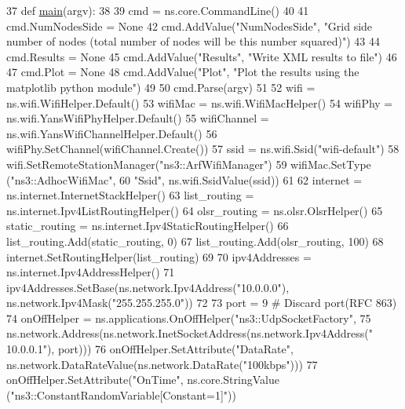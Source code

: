 \begin{DoxyCode}
37 \textcolor{keyword}{def }\hyperlink{namespacewifi-olsr-flowmon_ab8793f3e28ca4a531001056ef52436e4}{main}(argv):
38 
39     cmd = ns.core.CommandLine()
40 
41     cmd.NumNodesSide = \textcolor{keywordtype}{None}
42     cmd.AddValue(\textcolor{stringliteral}{"NumNodesSide"}, \textcolor{stringliteral}{"Grid side number of nodes (total number of nodes will be this number
       squared)"})
43 
44     cmd.Results = \textcolor{keywordtype}{None}
45     cmd.AddValue(\textcolor{stringliteral}{"Results"}, \textcolor{stringliteral}{"Write XML results to file"})
46 
47     cmd.Plot = \textcolor{keywordtype}{None}
48     cmd.AddValue(\textcolor{stringliteral}{"Plot"}, \textcolor{stringliteral}{"Plot the results using the matplotlib python module"})
49 
50     cmd.Parse(argv)
51 
52     wifi = ns.wifi.WifiHelper.Default()
53     wifiMac = ns.wifi.WifiMacHelper()
54     wifiPhy = ns.wifi.YansWifiPhyHelper.Default()
55     wifiChannel = ns.wifi.YansWifiChannelHelper.Default()
56     wifiPhy.SetChannel(wifiChannel.Create())
57     ssid = ns.wifi.Ssid(\textcolor{stringliteral}{"wifi-default"})
58     wifi.SetRemoteStationManager(\textcolor{stringliteral}{"ns3::ArfWifiManager"})
59     wifiMac.SetType (\textcolor{stringliteral}{"ns3::AdhocWifiMac"},
60                      \textcolor{stringliteral}{"Ssid"}, ns.wifi.SsidValue(ssid))
61 
62     internet = ns.internet.InternetStackHelper()
63     list\_routing = ns.internet.Ipv4ListRoutingHelper()
64     olsr\_routing = ns.olsr.OlsrHelper()
65     static\_routing = ns.internet.Ipv4StaticRoutingHelper()
66     list\_routing.Add(static\_routing, 0)
67     list\_routing.Add(olsr\_routing, 100)
68     internet.SetRoutingHelper(list\_routing)
69 
70     ipv4Addresses = ns.internet.Ipv4AddressHelper()
71     ipv4Addresses.SetBase(ns.network.Ipv4Address(\textcolor{stringliteral}{"10.0.0.0"}), ns.network.Ipv4Mask(\textcolor{stringliteral}{"255.255.255.0"}))
72 
73     port = 9   \textcolor{comment}{# Discard port(RFC 863)}
74     onOffHelper = ns.applications.OnOffHelper(\textcolor{stringliteral}{"ns3::UdpSocketFactory"},
75                                   ns.network.Address(ns.network.InetSocketAddress(ns.network.Ipv4Address(\textcolor{stringliteral}{"
      10.0.0.1"}), port)))
76     onOffHelper.SetAttribute(\textcolor{stringliteral}{"DataRate"}, ns.network.DataRateValue(ns.network.DataRate(\textcolor{stringliteral}{"100kbps"})))
77     onOffHelper.SetAttribute(\textcolor{stringliteral}{"OnTime"}, ns.core.StringValue (\textcolor{stringliteral}{"ns3::ConstantRandomVariable[Constant=1]"}))

\end{DoxyCode}
